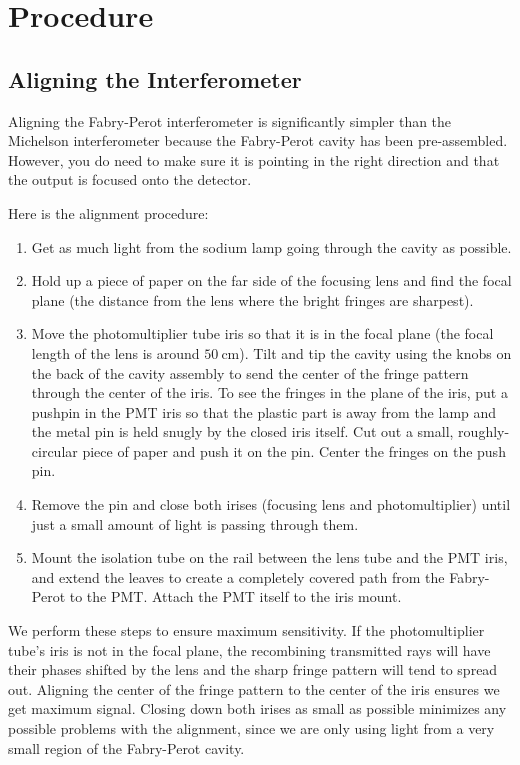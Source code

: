\documentclass[]{manual}
\begin{document}
    \section{Procedure}

    \subsection{Aligning the Interferometer}
    Aligning the Fabry-Perot interferometer is significantly simpler than the Michelson interferometer because the Fabry-Perot cavity has been pre-assembled.
    However, you do need to make sure it is pointing in the right direction and that the output is focused onto the detector.

    Here is the alignment procedure:
    \begin{enumerate}
        \item Get as much light from the sodium lamp going through the cavity as possible.
        \item Hold up a piece of paper on the far side of the focusing lens and find the focal plane (the distance from the lens where the bright fringes are sharpest).
        \item Move the photomultiplier tube iris so that it is in the focal plane (the focal length of the lens is around $\SI{50}{\centi\meter}$).
        Tilt and tip the cavity using the knobs on the back of the cavity assembly to send the center of the fringe pattern through the center of the iris.
        To see the fringes in the plane of the iris, put a pushpin in the PMT iris so that the plastic part is away from the lamp and the metal pin is held snugly by the closed iris itself.
        Cut out a small, roughly-circular piece of paper and push it on the pin.
        Center the fringes on the push pin.
        \item Remove the pin and close both irises (focusing lens and photomultiplier) until just a small amount of light is passing through them.
        \item Mount the isolation tube on the rail between the lens tube and the PMT iris, and extend the leaves to create a completely covered path from the Fabry-Perot to the PMT.
        Attach the PMT itself to the iris mount.
    \end{enumerate}

    We perform these steps to ensure maximum sensitivity.
    If the photomultiplier tube's iris is not in the focal plane, the recombining transmitted rays will have their phases shifted by the lens and the sharp fringe pattern will tend to spread out.
    Aligning the center of the fringe pattern to the center of the iris ensures we get maximum signal.
    Closing down both irises as small as possible minimizes any possible problems with the alignment, since we are only using light from a very small region of the Fabry-Perot cavity.
\end{document}
